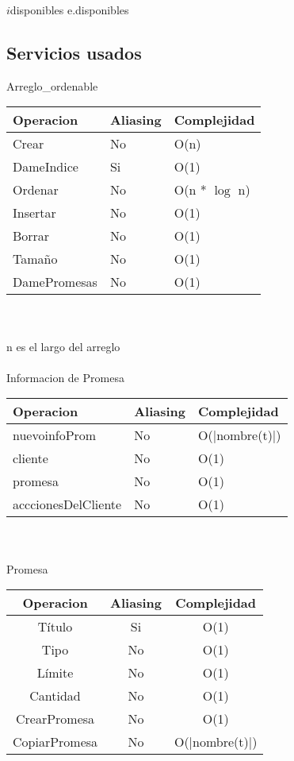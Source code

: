 	
	\begin{algorithm}{$i$disponibles}{}{}
		\RETURN e.disponibles
	\end{algorithm}


\subsection{Servicios usados}

{\Large Arreglo\_ordenable}\\

\begin{tabular}[c]{|l|l|l|}
		\hline
		Operacion & Aliasing & Complejidad \\
		\hline
		Crear & No & O(n) \\
		\hline
		DameIndice & Si & O(1)\\
		\hline
		Ordenar & No & O(n * $\log$ n)\\
		\hline
		Insertar & No & O(1)\\
		\hline
		Borrar & No & O(1)\\
		\hline
		Tama\~no & No & O(1)\\
		\hline
		DamePromesas & No & O(1)\\
		\hline
	
	\end{tabular}\\\\
n es el largo del arreglo\\
\\
{\LARGE Informacion de Promesa }
\\
\begin{tabular}[c]{|l|l|l|}
		\hline
		Operacion & Aliasing & Complejidad \\
		\hline
		nuevoinfoProm & No & O(|nombre(t)|) \\
		\hline
		cliente & No & O(1) \\
		\hline
		promesa & No & O(1) \\
		\hline
		acccionesDelCliente & No & O(1) \\
		\hline
	\end{tabular}\\\\


{\LARGE Promesa} \\

\begin{tabular}[c]{|c|c|c|}
	
	\hline
		Operacion & Aliasing & Complejidad \\
		\hline
		T\'itulo & Si &  O(1)\\
		\hline
		Tipo & No & O(1)\\
		\hline
		L\'imite & No & O(1)\\
		\hline
		Cantidad& No & O(1)\\
		\hline
		CrearPromesa & No & O(1)\\
		\hline
		CopiarPromesa & No & O(|nombre(t)|)\\
		\hline
	\end{tabular}\\\\
	
